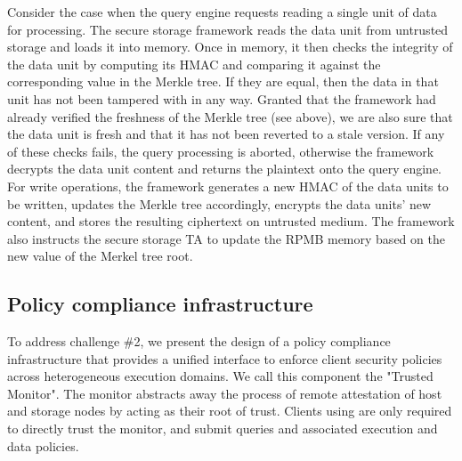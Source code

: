 Consider the case when the query engine requests reading a single unit of data for processing. The secure storage framework reads the data unit from untrusted storage and loads it into memory. Once in memory, it then checks the integrity of the data unit by computing its HMAC and comparing it against the corresponding value in the Merkle tree. If they are equal, then the data in that unit has not been tampered with in any way. Granted that the framework had already verified the freshness of the Merkle tree (see above), we are also sure that the data unit is fresh and that it has not been reverted to a stale version. If any of these checks fails, the query processing is aborted, otherwise the framework decrypts the data unit content and returns the plaintext onto the query engine. For write operations, the framework generates a new HMAC of the data units to be written, updates the Merkle tree accordingly, encrypts the data units' new content, and stores the resulting ciphertext on untrusted medium. The framework also instructs the secure storage TA to update the RPMB memory based on the new value of the Merkel tree root.

\subsection{Policy compliance infrastructure}
\label{subsec:design-trusted-monitor}


To address challenge \#2, we present the design of a policy compliance infrastructure that provides a unified interface to enforce client security policies across heterogeneous execution domains. We call this component the "Trusted Monitor". The monitor abstracts away the process of remote attestation of host and storage nodes by acting as their root of trust. Clients using \project{} are only required to directly trust the monitor, and submit queries and associated execution and data policies.


